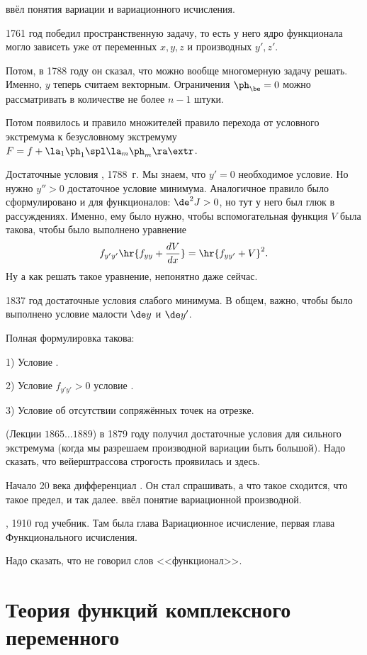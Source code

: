 \documentclass[a4paper,oneside,fleqn,10pt]{article}
\newcommand{\pe}[2]{${#1}\ldots{#2}$}
\begin{document}
 ввёл понятия вариации и вариационного исчисления.

1761 год  победил пространственную задачу, то есть у
него ядро функционала могло зависеть уже от переменных $x,y,z$ и
производных $y', z'$.

Потом, в 1788 году он сказал, что можно вообще многомерную задачу
решать.  Именно, $y$ теперь считаем векторным. Ограничения $\ph_\be =
0$ можно рассматривать в количестве не более $n-1$ штуки.

Потом появилось и правило множителей  правило
перехода от условного экстремума к безусловному экстремуму $F = f +
\la_1 \ph_1\spl \la_m \ph_m \ra \extr$.

Достаточные условия , 1788~г. Мы знаем, что $y' = 0$
необходимое условие.  Но нужно $y''> 0$ достаточное условие минимума.
Аналогичное правило было сформулировано и для функционалов: $\de^2 J >
0$, но тут у него был глюк в рассуждениях. Именно, ему было нужно,
чтобы вспомогательная функция $V$ была такова, чтобы было выполнено
уравнение
$$f_{y'y'} \hr{f_{yy} + \frac{dV}{dx}} = \hr{f_{yy'} + V}^2.$$ Ну а
как решать такое уравнение, непонятно даже сейчас.

1837 год достаточные условия слабого минимума. В общем, важно, чтобы
было выполнено условие малости $\de y$ и $\de y'$.

Полная формулировка такова:

1) Условие .

2) Условие $f_{y'y'} > 0$ условие .

3) Условие  об отсутствии сопряжённых точек на отрезке.

 (Лекции \pe{1865}{1889}) в 1879 году получил
достаточные условия для сильного экстремума (когда мы разрешаем
производной вариации быть большой).  Надо сказать, что вейерштрассова
строгость проявилась и здесь.

Начало 20 века дифференциал . Он стал спрашивать, а что
такое сходится, что такое предел, и так далее.  ввёл
понятие вариационной производной.

, 1910 год учебник. Там была глава Вариационное
исчисление, первая глава Функционального исчисления.

Надо сказать, что  не говорил слов <<функционал>>.


\section{Теория функций комплексного переменного}
\end{document}
